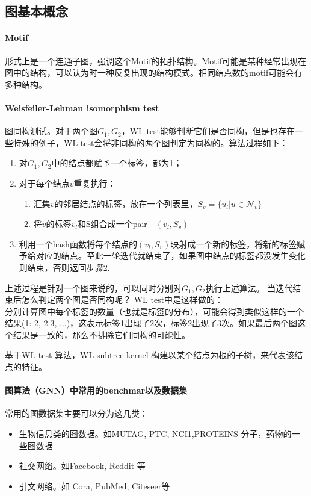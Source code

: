 \subsection{图基本概念}
\paragraph{Motif} 形式上是一个连通子图，强调这个Motif的拓扑结构。Motif可能是某种经常出现在图中的结构，可以认为时一种反复出现的结构模式。相同结点数的motif可能会有多种结构。

\paragraph{Weisfeiler-Lehman isomorphism test}  图同构测试。对于两个图$G_1, G_2$，WL test能够判断它们是否同构，但是也存在一些特殊的例子，WL test会将非同构的两个图判定为同构的。算法过程如下：
\begin{enumerate}
	\item 对$G_1, G_2$中的结点都赋予一个标签，都为1；
	\item 对于每个结点$v$重复执行：
	\begin{enumerate}
		\item 汇集$v$的邻居结点的标签，放在一个列表里，$S_v = \{u_l | u \in \mathcal{N}_v \}$
		\item 将$v$的标签$v_l$和S组合成一个pair---$(v_l, S_v)$
	\end{enumerate}
	\item 利用一个hash函数将每个结点的$(v_l, S_v)$映射成一个新的标签，将新的标签赋予给对应的结点。至此一轮迭代就结束了，如果图中结点的标签都没发生变化则结束，否则返回步骤2.
\end{enumerate}
上述过程是针对一个图来说的，可以同时分别对$G_1, G_2$执行上述算法。
当迭代结束后怎么判定两个图是否同构呢？
WL test中是这样做的：\\
分别计算图中每个标签的数量（也就是标签的分布），可能会得到类似这样的一个结果(1: 2, 2:3, ...)，这表示标签1出现了2次，标签2出现了3次。如果最后两个图这个结果是一致的，那么不排除它们同构的可能性。

基于WL test 算法，WL subtree kernel\cite{shervashidze2011weisfeiler} 构建以某个结点为根的子树，来代表该结点的特征。

\paragraph{图算法（GNN）中常用的benchmar以及数据集} 常用的图数据集主要可以分为这几类：
\begin{itemize}
	\item 生物信息类的图数据。如MUTAG, PTC, NCI1,PROTEINS 分子，药物的一些图数据
	\item 社交网络。如Facebook, Reddit 等
	\item 引文网络。如 Cora, PubMed, Citeseer等
\end{itemize}

